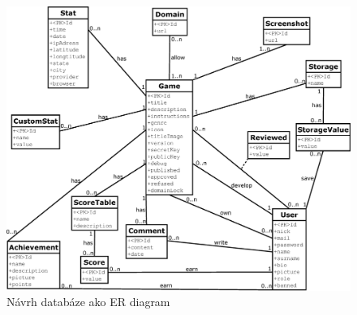 \begin{figure}[h]
  \centering
  \includegraphics[scale=0.4]{fig/erd.eps}
  \caption{Návrh databáze ako ER diagram}
  \label{fig:erd}
\end{figure}

